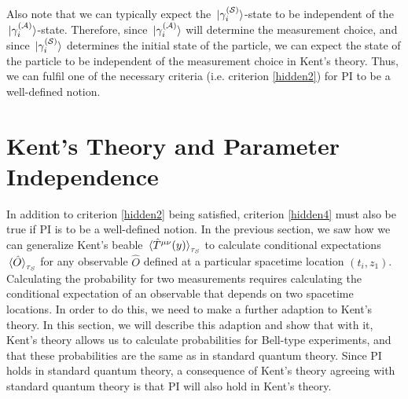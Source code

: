 Also note that we can typically expect the $\ket*{\gamma_i^{(\mathcal{S})}}$-state to be independent of the $\ket*{\gamma_i^{(\mathcal{A})}}$-state. Therefore, since $\ket*{\gamma_i^{(\mathcal{A})}}$ will determine the measurement choice, and since $\ket*{\gamma_i^{(\mathcal{S})}}$ determines the initial state of the particle, we can expect the state of the particle to be independent of the measurement choice in Kent's theory. Thus, we can fulfil one of the necessary criteria (i.e. criterion \ref{hidden2}) for PI to be a well-defined notion.

\section{Kent's Theory and Parameter Independence\label{kentpi}}
In addition to criterion \ref{hidden2} being satisfied, criterion \ref{hidden4} must also be true if PI is to be a well-defined notion. In the previous section, we saw how we can generalize Kent's beable $\ev*{\hat{T}^{\mu\nu}(y)}_{\tau_S}$ to calculate conditional expectations $\ev*{\hat{O}}_{\tau_S}$ for any observable $\hat{O}$ defined at a particular spacetime location $(t_i, z_1)$. Calculating the probability for two measurements requires calculating the conditional expectation of an observable that depends on two spacetime locations. In order to do this, we need to make a further adaption to Kent's theory. In this section, we will describe this adaption and show that with it, Kent's theory allows us to calculate probabilities for Bell-type experiments, and that these probabilities are the same as in standard quantum theory. Since PI holds in standard quantum theory,  a consequence of Kent's theory agreeing with standard quantum theory is that PI will also hold in Kent's theory.


